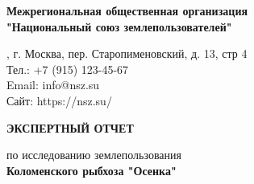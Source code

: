 \begin{titlepage}
    \begin{center}
        \setlength{\baselineskip}{1.3\baselineskip}
        \setlength{\parskip}{0.5\baselineskip} %
        
        
        \vspace{0.5cm}
        
        {\fontsize{16}{18}\selectfont \textbf{Межрегиональная общественная организация \\"Национальный союз землепользователей"}}
        
        \vspace{0cm} %
        
        {\fontsize{12}{14}, г. Москва, пер. Старопименовский, д. 13, стр 4\\[3pt] %
        Тел.: +7 (915) 123-45-67\\[3pt]
        Email: info@nsz.su\\[3pt]
        Сайт: https://nsz.su/}
        
        \vspace{1cm} %
        
        {\fontsize{20}{24}\selectfont \textbf{ЭКСПЕРТНЫЙ ОТЧЕТ}}
        
        \vspace{0.5cm} %
        
        {\fontsize{16}{18}\selectfont 
        по исследованию землепользования\\[5pt] %
        \textbf{Коломенского рыбхоза "Осенка"}}
        

\end{center}
\end{titlepage}
